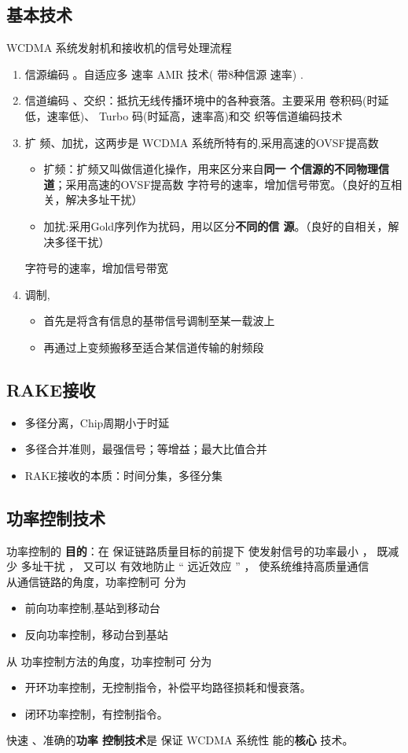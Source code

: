\subsection{基本技术}
WCDMA 系统发射机和接收机的信号处理流程
\begin{enumerate}
	\item 信源编码 。自适应多 速率 AMR
	技术( 带8种信源 速率) .
	\item 信道编码 、交织：抵抗无线传播环境中的各种衰落。主要采用 卷积码(时延低，速率低)、 Turbo 码(时延高，速率高)和交
	织等信道编码技术
	\item 扩 频、加扰，这两步是 WCDMA 系统所特有的,采用高速的OVSF提高数
	\begin{itemize}
		\item 扩频：扩频又叫做信道化操作，用来区分来自\textbf{同一
		个信源的不同物理信道}；采用高速的OVSF提高数
		字符号的速率，增加信号带宽。（良好的互相关，解决多址干扰）
		\item 加扰:采用Gold序列作为扰码，用以区分\textbf{不同的信
		源}。（良好的自相关，解决多径干扰）
	\end{itemize}
	字符号的速率，增加信号带宽
	\item 调制,
	\begin{itemize}
		\item 首先是将含有信息的基带信号调制至某一载波上
		\item 再通过上变频搬移至适合某信道传输的射频段
	\end{itemize}
\end{enumerate}
\subsection{RAKE接收}
\begin{itemize}
	\item 多径分离，Chip周期小于时延
	\item 多径合并准则，最强信号；等增益；最大比值合并
	\item  RAKE接收的本质：时间分集，多径分集
\end{itemize}
\subsection{功率控制技术}
功率控制的 \textbf{目的}：在 保证链路质量目标的前提下
使发射信号的功率最小 ， 既减少 多址干扰 ， 又可以
有效地防止 “ 远近效应 ” ， 使系统维持高质量通信\\	
从通信链路的角度，功率控制可 分为
\begin{itemize}
	\item 前向功率控制,基站到移动台
	\item 反向功率控制，移动台到基站
\end{itemize}
从 功率控制方法的角度，功率控制可 分为
\begin{itemize}
	\item 开环功率控制，无控制指令，补偿平均路径损耗和慢衰落。
	\item 闭环功率控制，有控制指令。 
\end{itemize}
快速 、准确的\textbf{功率 控制技术}是 保证 WCDMA 系统性
能的\textbf{核心 }技术。

